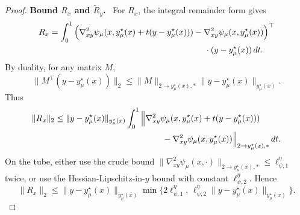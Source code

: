 \documentclass{article}
\newcommand{\proofstep}[1]{\par\smallskip\noindent\textbf{#1}\ }
\begin{document}
\begin{proof}
\proofstep{Bound \(R_x\) and \(\widetilde R_y\).}
For \(R_x\), the integral remainder form gives
\begin{align}
R_x
&=
\int_0^1
\Big(
\nabla^2_{xy}\psi_\mu(x,y_\mu^\star(x)+t(y-y_\mu^\star(x)))
-
\nabla^2_{xy}\psi_\mu(x,y_\mu^\star(x))
\Big)^\top
\nonumber\\
&\hspace{6.5cm}\cdot
(y-y_\mu^\star(x))\,dt .
\label{eq:support_Rx_integral}
\end{align}
By duality, for any matrix \(M\),
\[
\|M^\top(y-y_\mu^\star(x))\|_2
\le
\|M\|_{2\to y_\mu^\star(x),*}
\|y-y_\mu^\star(x)\|_{y_\mu^\star(x)}.
\]
Thus
\begin{align}
\|R_x\|_2
&\le
\|y-y_\mu^\star(x)\|_{y_\mu^\star(x)}
\int_0^1
\Big\|
\nabla^2_{xy}\psi_\mu(x,y_\mu^\star(x)+t(y-y_\mu^\star(x)))
\nonumber\\
&\hspace{4.5cm}
-
\nabla^2_{xy}\psi_\mu(x,y_\mu^\star(x))
\Big\|_{2\to y_\mu^\star(x),*}\,dt .
\label{eq:support_Rx_prebound}
\end{align}
On the tube, either use the crude bound
\(\|\nabla^2_{xy}\psi_\mu(x,\cdot)\|_{2\to y_\mu^\star(x),*}\le\ell_{\psi,1}^\eta\) twice, or use the
Hessian-Lipschitz-in-\(y\) bound with constant \(\ell_{\psi,2}^\eta\). Hence
\begin{equation}
\label{eq:support_Rx_bound}
\|R_x\|_2
\le
\|y-y_\mu^\star(x)\|_{y_\mu^\star(x)}
\min\Big\{
2\ell_{\psi,1}^\eta,\,
\ell_{\psi,2}^\eta\|y-y_\mu^\star(x)\|_{y_\mu^\star(x)}
\Big\}.
\end{equation}


\end{proof}
\end{document}
